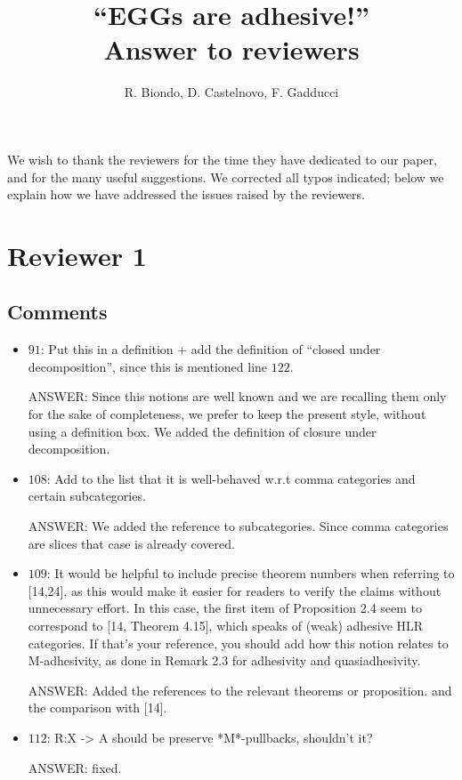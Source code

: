 \documentclass[english,11pt,a4paper]{article}
\title{``EGGs are adhesive!''\\
	Answer to reviewers}
\author{R. Biondo, D. Castelnovo, F. Gadducci}
\begin{document}
	\maketitle
	
	
We wish to thank the reviewers for the time they have dedicated to our paper, and for the many useful suggestions. We corrected all typos indicated; below we explain how we have addressed the issues raised by the reviewers.

\section*{Reviewer 1}
\subsection*{Comments}
\begin{itemize}
\item  $91$:  Put this in a definition + add the definition of ``closed under decomposition'', since this is mentioned line $122$.

ANSWER: Since this notions are well known and we are recalling them only for the sake of completeness, we prefer to keep the present style, without using a definition box. We added the definition of closure under decomposition.

\item $108$: Add to the list that it is well-behaved w.r.t comma categories and certain subcategories.

ANSWER: We added the reference to subcategories. Since comma categories are slices that case is already covered.

\item $109$: It would be helpful to include precise theorem numbers when referring to [14,24], as this would make it easier for readers to verify the claims without unnecessary effort. In this case, the first item of Proposition 2.4 seem to correspond to [14, Theorem 4.15], which speaks of (weak) adhesive HLR categories. If that's your reference, you should add how this notion relates to M-adhesivity, as done in Remark 2.3 for adhesivity and quasiadhesivity.

ANSWER: Added the references to the relevant theorems or proposition. and the comparison with [14].

\item $112$: R:X -> A should be preserve *M*-pullbacks, shouldn't it? 

ANSWER: fixed.


\end{itemize}
\end{document}
